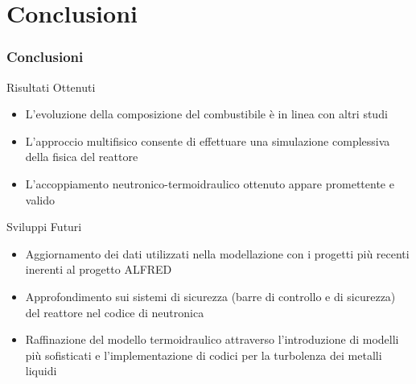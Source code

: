 \section{Conclusioni}
\begin{frame}
\vspace{0.5cm}
\frametitle{Conclusioni}
\begin{block}{Risultati Ottenuti}
\begin{itemize}
\item L'evoluzione della composizione del combustibile è in linea con altri studi
\item L'approccio multifisico consente di effettuare una simulazione complessiva della fisica del reattore
\item L'accoppiamento neutronico-termoidraulico ottenuto appare promettente e valido



\end{itemize}
\end{block}
\begin{block}{Sviluppi Futuri}
\begin{itemize}
\item Aggiornamento dei dati utilizzati nella modellazione con i progetti più recenti inerenti al progetto ALFRED
\item Approfondimento sui sistemi di sicurezza (barre di controllo e di sicurezza) del reattore nel codice di neutronica
\item Raffinazione del modello termoidraulico attraverso l'introduzione di modelli più sofisticati 
      e l'implementazione di codici per la turbolenza dei metalli liquidi
\end{itemize}
\end{block}

\end{frame}

